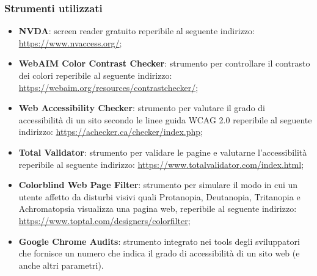 \documentclass[12pt]{article}
\begin{document}
	\subsubsection{Strumenti utilizzati}
		\begin{itemize}
			\item \textbf{NVDA}: screen reader gratuito reperibile al seguente indirizzo: \url{https://www.nvaccess.org/};
			\item \textbf{WebAIM Color Contrast Checker}: strumento per controllare il contrasto dei colori reperibile al seguente indirizzo: \url{https://webaim.org/resources/contrastchecker/};
			\item \textbf{Web Accessibility Checker}: strumento per valutare il grado di accessibilità di un sito secondo le linee guida WCAG 2.0 reperibile al seguente indirizzo: \url{https://achecker.ca/checker/index.php};
			\item \textbf{Total Validator}: strumento per validare le pagine e valutarne l'accessibilità reperibile al seguente indirizzo: \url{https://www.totalvalidator.com/index.html};
			\item \textbf{Colorblind Web Page Filter}: strumento per simulare il modo in cui un utente affetto da disturbi visivi quali Protanopia, Deutanopia, Tritanopia e Achromatopsia visualizza una pagina web, reperibile al seguente indirizzo: \url{https://www.toptal.com/designers/colorfilter};
			\item \textbf{Google Chrome Audits}: strumento integrato nei tools degli sviluppatori che fornisce un numero che indica il grado di accessibilità di un sito web (e anche altri parametri).
		\end{itemize}
\end{document}
